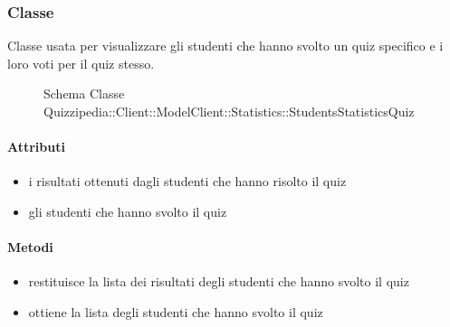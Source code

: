 \subsubsection{Classe }
Classe usata per visualizzare gli studenti che hanno svolto un quiz specifico e i loro voti per il quiz stesso.
\begin{figure}[H]
\centering
\noindent{}
\caption[Schema Classe StudentsStatisticsQuiz]{Schema Classe Quizzipedia::Client::ModelClient::Statistics::StudentsStatisticsQuiz}
\end{figure}
\paragraph{Attributi}
\begin{itemize}
\item {}
\newline
i risultati ottenuti dagli studenti che hanno risolto il quiz
\item {}
\newline
gli studenti che hanno svolto il quiz
\end{itemize}
\paragraph{Metodi}
\begin{itemize}
\item {}
\newline
restituisce la lista dei risultati degli studenti che hanno svolto il quiz
\newline
\item {}
\newline
ottiene la lista degli studenti che hanno svolto il quiz
\newline
\end{itemize}
